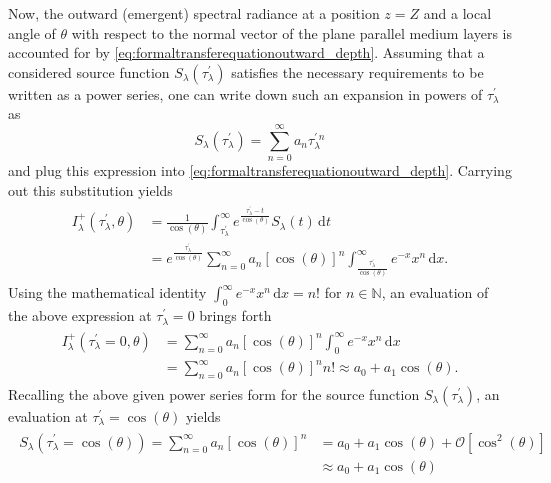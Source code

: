 \documentclass[a4paper,12pt]{report}
\begin{document}
Now, the outward (emergent) spectral radiance at a position $z=Z$ and a local angle of $\theta$ with respect to the normal vector of the plane parallel medium layers is accounted for by \cref{eq:formaltransferequationoutward_depth}. Assuming that a considered source function $S_\lambda(\tau_\lambda^\prime)$ satisfies the necessary requirements to be written as a power series, one can write down such an expansion in powers of $\tau_\lambda^\prime$ as \begin{equation}
S_\lambda(\tau_\lambda^\prime) = \sum_{n=0}^{\infty}a_n\tau_\lambda^{\prime\,n}
\end{equation} and plug this expression into \cref{eq:formaltransferequationoutward_depth}. Carrying out this substitution yields \begin{align}
\begin{aligned}
I^+_\lambda(\tau_\lambda^\prime, \theta) &= \frac{1}{\cos(\theta)}\int_{\tau^\prime_\lambda}^{\infty} e^{\frac{\tau_\lambda^\prime - t}{\cos(\theta)}}S_\lambda(t)\,\mathrm{d}t \\ &= e^{\frac{\tau_\lambda^\prime}{\cos(\theta)}}\sum_{n=0}^{\infty}a_n[\cos(\theta)]^n\int_{\frac{\tau^\prime_\lambda}{\cos(\theta)}}^{\infty} e^{-x}x^n\,\mathrm{d}x.
\end{aligned}
\end{align} Using the mathematical identity $\int_{0}^{\infty} e^{-x}x^n\,\mathrm{d}x = n!$ for $n \in \mathbb{N}$, an evaluation of the above expression at $\tau_\lambda^\prime = 0$ brings forth \begin{align}\label{eq:derivation_eddington_barbier_1}
\begin{aligned}
I_\lambda^+(\tau_\lambda^\prime = 0, \theta) &= \sum_{n=0}^{\infty}a_n\left[\cos(\theta)\right]^n\int_{0}^{\infty}e^{-x}x^n\,\mathrm{d}x \\ &= \sum_{n=0}^{\infty}a_n \left[\cos(\theta)\right]^n n! \approx a_0 + a_1\cos(\theta).
\end{aligned}
\end{align} Recalling the above given power series form for the source function $S_\lambda(\tau_\lambda^\prime)$, an evaluation at $\tau^\prime_\lambda = \cos(\theta)$ yields \begin{align}\begin{aligned}\label{eq:derivation_eddington_barbier_2}
S_\lambda(\tau_\lambda^\prime = \cos(\theta)) = \sum_{n=0}^{\infty} a_n\left[\cos(\theta)\right]^n &= a_0 + a_1\cos(\theta) + \mathcal{O}[\cos^2(\theta)] \\
&\approx a_0 + a_1\cos(\theta)

\end{aligned}
\end{align}
\end{document}
